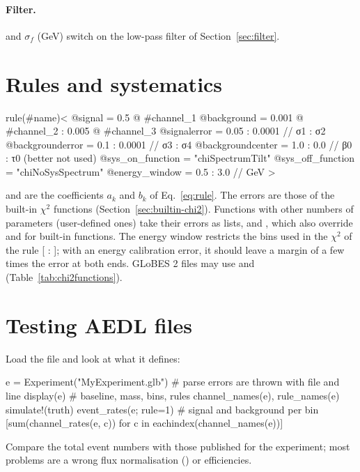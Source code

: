 \paragraph{Filter.}\label{sec:aedl-filter}  and
$\sigma_f$ (GeV) switch on the low-pass filter of
Section~\ref{sec:filter}.

\section{Rules and systematics}\label{sec:aedl-rule}

\begin{aedl}
rule(#name)<
   @signal          = 0.5 @ #channel_1
   @background      = 0.001 @ #channel_2 : 0.005 @ #channel_3
   @signalerror     = 0.05 : 0.0001        // σ1 : σ2
   @backgrounderror = 0.1 : 0.0001         // σ3 : σ4
   @backgroundcenter = 1.0 : 0.0           // β0 : τ0 (better not used)
   @sys_on_function  = "chiSpectrumTilt"
   @sys_off_function = "chiNoSysSpectrum"
   @energy_window    = 0.5 : 3.0            // GeV
>
\end{aedl}
 and  are the coefficients $a_k$ and $b_k$ of
Eq.~\eqref{eq:rule}. The errors are those of the built-in $\chi^2$ functions
(Section~\ref{sec:builtin-chi2}). Functions with other numbers of parameters
(user-defined ones) take their errors as lists,  and , which also override
 and  for built-in functions. The
energy window restricts the bins used in the $\chi^2$ of the rule
[ : ]; with an energy calibration error, it should
leave a margin of a few times the error at both ends. GLoBES 2 files may use
 and 
(Table~\ref{tab:chi2functions}).

\section{Testing AEDL files}

Load the file and look at what it defines:
\begin{julia}
e = Experiment("MyExperiment.glb")       # parse errors are thrown with file and line
display(e)                               # baseline, mass, bins, rules
channel_names(e), rule_names(e)
simulate!(truth)
event_rates(e; rule=1)                   # signal and background per bin
[sum(channel_rates(e, c)) for c in eachindex(channel_names(e))]
\end{julia}
Compare the total event numbers with those published for the experiment; most
problems are a wrong flux normalisation () or efficiencies.
